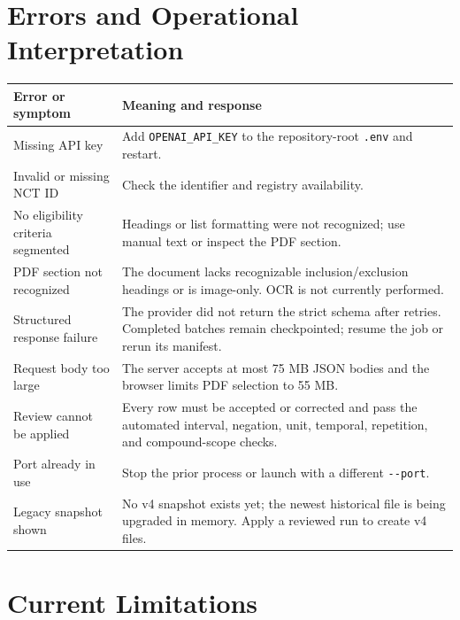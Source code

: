 \documentclass[11pt]{article}
\newcommand{\code}[1]{\nolinkurl{#1}}
\begin{document}
\section{Errors and Operational Interpretation}

\begin{longtable}{p{}p{}}
\toprule
Error or symptom & Meaning and response \\
\midrule
\endhead
Missing API key & Add \code{OPENAI_API_KEY} to the repository-root \code{.env} and restart. \\
Invalid or missing NCT ID & Check the identifier and registry availability. \\
No eligibility criteria segmented & Headings or list formatting were not recognized; use manual text or inspect the PDF section. \\
PDF section not recognized & The document lacks recognizable inclusion/exclusion headings or is image-only. OCR is not currently performed. \\
Structured response failure & The provider did not return the strict schema after retries. Completed batches remain checkpointed; resume the job or rerun its manifest. \\
Request body too large & The server accepts at most 75 MB JSON bodies and the browser limits PDF selection to 55 MB. \\
Review cannot be applied & Every row must be accepted or corrected and pass the automated interval, negation, unit, temporal, repetition, and compound-scope checks. \\
Port already in use & Stop the prior process or launch with a different \code{--port}. \\
Legacy snapshot shown & No v4 snapshot exists yet; the newest historical file is being upgraded in memory. Apply a reviewed run to create v4 files. \\
\bottomrule
\end{longtable}

\section{Current Limitations}
\end{document}
